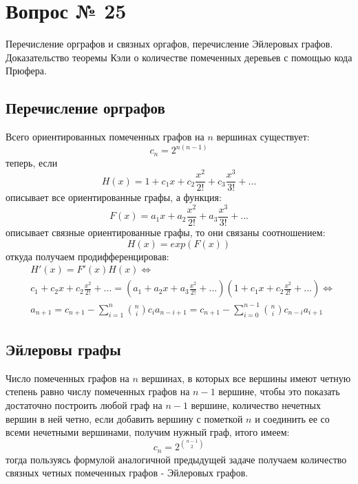 \chapter{Вопрос № 25}

Перечисление орграфов и связных оргафов, перечисление Эйлеровых графов. Доказательство теоремы Кэли о количестве помеченных деревьев с помощью кода Прюфера.

\section{Перечисление орграфов}

Всего ориентированных помеченных графов на $n$ вершинах существует:
\begin{equation}
	c_n = 2^{n\left(n-1\right)}
\end{equation}
теперь, если
\[
	H\left(x\right) = 1 + c_1x + c_2 \frac{x^2}{2!} + c_3 \frac{x^3}{3!} + ...
\]
описывает все ориентированные графы, а функция:
\[
	F\left(x\right) = a_1x + a_2\frac{x^2}{2!} + a_3\frac{x^3}{3!} + ...
\]
описывает связные ориентированные графы, то они связаны соотношением:
\begin{equation}
	H\left(x\right) = exp\left(F\left(x\right)\right)
\end{equation}
откуда получаем продифференцировав:
\[
	\begin{split}
		& H'\left(x\right)=F'\left(x\right)H\left(x\right) \Leftrightarrow \\
		& c_1 + c_2 x + c_2 \frac{x^2}{2!} + ... = \left(a_1 + a_2x + a_3\frac{x^2}{2!} + ...\right)\left(1 + c_1x + c_2\frac{x^2}{2!} + ...\right) \Leftrightarrow \\
		& a_{n+1} = c_{n+1} - \sum_{i=1}^{n} \binom{n}{i} c_{i}a_{n-i+1} = c_{n+1} - \sum_{i=0}^{n-1} \binom{n}{i} c_{n-i}a_{i+1}
	\end{split}
\]

\section{Эйлеровы графы}

Число помеченных графов на $n$ вершинах, в которых все вершины имеют четную степень равно числу помеченных графов на $n-1$ вершине, чтобы это показать достаточно построить любой граф на $n-1$ вершине, количество нечетных вершин в ней четно, если добавить вершину с пометкой $n$ и соединить ее со всеми нечетными вершинами, получим нужный граф, итого имеем:
\begin{equation}
	c_n = 2^{\binom{n-1}{2}}
\end{equation}
тогда пользуясь формулой аналогичной предыдущей задаче получаем количество связных четных помеченных графов - Эйлеровых графов.

